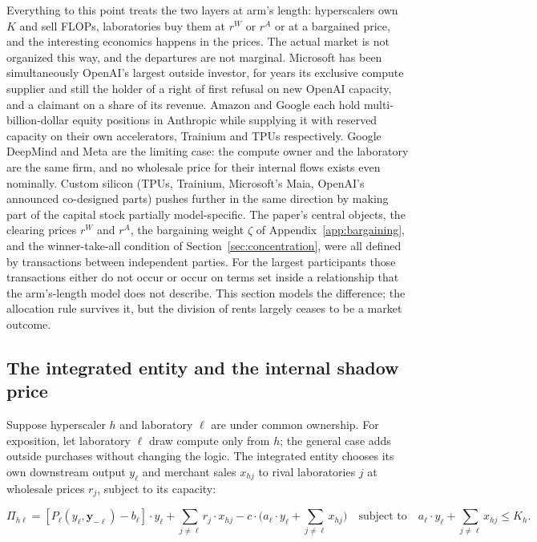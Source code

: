 \documentclass[11pt]{article}
\begin{document}
Everything to this point treats the two layers at arm's length: hyperscalers own $K$ and sell FLOPs, laboratories buy them at $r^W$ or $r^A$ or at a bargained price, and the interesting economics happens in the prices. The actual market is not organized this way, and the departures are not marginal. Microsoft has been simultaneously OpenAI's largest outside investor, for years its exclusive compute supplier and still the holder of a right of first refusal on new OpenAI capacity, and a claimant on a share of its revenue. Amazon and Google each hold multi-billion-dollar equity positions in Anthropic while supplying it with reserved capacity on their own accelerators, Trainium and TPUs respectively. Google DeepMind and Meta are the limiting case: the compute owner and the laboratory are the same firm, and no wholesale price for their internal flows exists even nominally. Custom silicon (TPUs, Trainium, Microsoft's Maia, OpenAI's announced co-designed parts) pushes further in the same direction by making part of the capital stock partially model-specific. The paper's central objects, the clearing prices $r^W$ and $r^A$, the bargaining weight $\zeta$ of Appendix~\ref{app:bargaining}, and the winner-take-all condition of Section~\ref{sec:concentration}, were all defined by transactions between independent parties. For the largest participants those transactions either do not occur or occur on terms set inside a relationship that the arm's-length model does not describe. This section models the difference; the allocation rule survives it, but the division of rents largely ceases to be a market outcome.

\subsection{The integrated entity and the internal shadow price}
\label{sec:integration-internal}

Suppose hyperscaler $h$ and laboratory $\ell$ are under common ownership. For exposition, let laboratory $\ell$ draw compute only from $h$; the general case adds outside purchases without changing the logic. The integrated entity chooses its own downstream output $y_\ell$ and merchant sales $x_{hj}$ to rival laboratories $j$ at wholesale prices $r_j$, subject to its capacity:

\begin{equation}\Pi_{h\ell}=\left[P_\ell(y_\ell,\mathbf y_{-\ell})-b_\ell\right]\cdot y_\ell+\sum_{j\neq\ell}r_j\cdot x_{hj}-c\cdot\Big(a_\ell\cdot y_\ell+\sum_{j\neq\ell}x_{hj}\Big)\quad\text{subject to}\quad a_\ell\cdot y_\ell+\sum_{j\neq\ell}x_{hj}\leq K_h.\end{equation}
\end{document}
